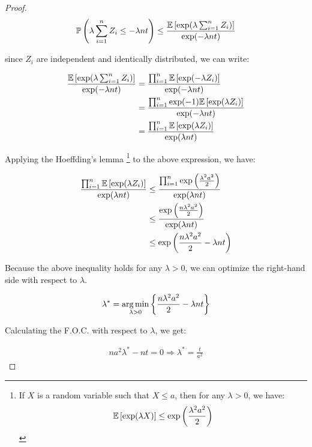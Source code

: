 \begin{proof}
    \begin{align*}
    \mathbb{P}\left(\lambda \sum_{i=1}^n Z_i \leq -\lambda nt\right) 
    \leq
    \frac{\mathbb{E}\left[\exp(\lambda \sum_{i=1}^n Z_i)\right]}{\exp(-\lambda nt)}
    \end{align*}
    
    since $Z_i$ are independent and identically distributed, we can write:
    
    \begin{align*}
    \frac{\mathbb{E}\left[\exp(\lambda \sum_{i=1}^n Z_i)\right]}{\exp(-\lambda nt)} 
    &=
    \frac{\prod_{i=1}^n \mathbb{E}\left[\exp(-\lambda Z_i)\right]}{\exp(-\lambda nt)}\\
    &=
    \frac{\prod_{i=1}^n \exp(-1)\mathbb{E}\left[\exp(\lambda Z_i)\right]}{\exp(-\lambda nt)}\\
    &=
        \frac{\prod_{i=1}^n \mathbb{E}\left[\exp(\lambda Z_i)\right]}{\exp(\lambda nt)} 
    \end{align*}
    
    Applying the Hoeffding's lemma \footnote{
        If $X$ is a random variable such that $X \leq a$, then for any $\lambda > 0$, we have:
        \begin{align*}
        \mathbb{E}\left[\exp(\lambda X)\right] 
        \leq
        \exp\left(\frac{\lambda^2a^2}{2}\right)
        \end{align*}
    } to the above expression, we have:
    
    \begin{align*}
    \frac{\prod_{i=1}^n \mathbb{E}\left[\exp(\lambda Z_i)\right]}{\exp(\lambda nt)} 
    &\leq
    \frac{\prod_{i = 1}^n \exp\left(\frac{\lambda^2a^2}{2}\right)}{\exp(\lambda nt)}\\
    &\leq
    \frac{\exp\left(\frac{n\lambda^2a^2}{2}\right)}{\exp(\lambda nt)}\\
   &\leq
    \exp\left(\frac{n\lambda^2a^2}{2} - \lambda nt \right)\\
    \end{align*}
    
    Because the above inequality holds for any $\lambda > 0$, we can optimize the right-hand side with respect to $\lambda$.
    
    \begin{align*}
    \lambda^* = \operatorname*{arg\,min}_{\lambda > 0} \left\{ \frac{n\lambda^2a^2}{2} - \lambda nt \right\}
    \end{align*}
    
    Calculating the F.O.C. with respect to $\lambda$, we get:
    
    \begin{align*}
    n a^2 \lambda^* - nt = 0 \Rightarrow \lambda^* = \frac{t}{a^2}
    \end{align*}
    

\end{proof}
